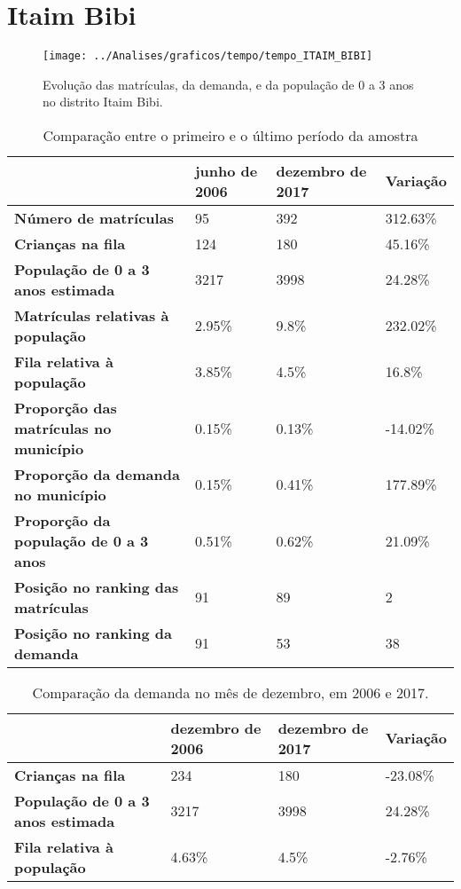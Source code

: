 \section{Itaim Bibi}
\begin{figure}[H]
\centering
\texttt{[image: ../Analises/graficos/tempo/tempo\_ITAIM\_BIBI]}
\caption{Evolução das matrículas, da demanda, e da população de 0 a 3 anos no distrito Itaim Bibi.}
\end{figure}
\begin{table}[H]
\begin{tabular}{|l|l|l|l|}
\hline
\textbf{}                                      & \textbf{junho de 2006}       & \textbf{dezembro de 2017}    & \textbf{Variação} \\ \hline
\textbf{Número de matrículas}                  & 95 & 392 & 312.63\% \\ \hline
\textbf{Crianças na fila}                      & 124 & 180 & 45.16\% \\ \hline
\textbf{População de 0 a 3 anos estimada}      & 3217 & 3998 & 24.28\% \\ \hline
\textbf{Matrículas relativas à população}      & 2.95\% & 9.8\% & 232.02\% \\ \hline
\textbf{Fila relativa à população}             & 3.85\% & 4.5\% & 16.8\% \\ \hline
\textbf{Proporção das matrículas no município} & 0.15\% & 0.13\% & -14.02\% \\ \hline
\textbf{Proporção da demanda no município}     & 0.15\% & 0.41\% & 177.89\% \\ \hline
\textbf{Proporção da população de 0 a 3 anos}  & 0.51\% & 0.62\% & 21.09\% \\ \hline
\textbf{Posição no ranking das matrículas}     & 91 & 89 & 2 \\ \hline
\textbf{Posição no ranking da demanda}         & 91 & 53 & 38 \\ \hline
\end{tabular}
\caption{Comparação entre o primeiro e o último período da amostra}
\end{table}
\begin{table}[H]
\begin{tabular}{|l|l|l|l|}
\hline
\textbf{}                                 & \textbf{dezembro de 2006} & \textbf{dezembro de 2017} & \textbf{Variação} \\ \hline
\textbf{Crianças na fila}                      & 234 & 180 & -23.08\% \\ \hline
\textbf{População de 0 a 3 anos estimada}      & 3217 & 3998 & 24.28\% \\ \hline
\textbf{Fila relativa à população}             & 4.63\% & 4.5\% & -2.76\% \\ \hline
\end{tabular}
\caption{Comparação da demanda no mês de dezembro, em 2006 e 2017.}
\end{table}
